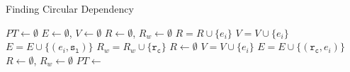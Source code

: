 \begin{algorithm}
\caption{Finding Circular Dependency}\label{algo:circular}
\begin{algorithmic}[1]
\State $\mathit{PT} \gets \emptyset$
\State $\mathit{E} \gets \emptyset$, $\mathit{V} \gets \emptyset$
\State $\mathit{R} \gets \emptyset$, $\mathit{R_w} \gets \emptyset$
\State $\mathit{R} = \mathit{R} \cup \{\mathit{e_i}\}$
\State $\mathit{V} = \mathit{V} \cup \{\mathit{e_i}\}$
 
\State $\mathit{E} = \mathit{E} \cup \{(\mathit{e_i},\mathtt{s_l})\}$  
\EndFor
\EndIf
{}
\State $\mathit{R_w} = \mathit{R_w} \cup \{\mathtt{r_c}\}$
\EndFor
\State $\mathit{R} \gets \emptyset$ 
\EndIf
{}
\State $\mathit{V} = \mathit{V} \cup \{\mathit{e_i}\}$
  
\State $\mathit{E} = \mathit{E} \cup \{(\mathtt{r_c},\mathit{e_i})\}$
\EndFor
\EndIf
\EndFor
\State $\mathit{R} \gets \emptyset$, $\mathit{R_w} \gets \emptyset$
\EndFor
\State $\mathit{PT} \gets$ 
\end{algorithmic}
\end{algorithm}


